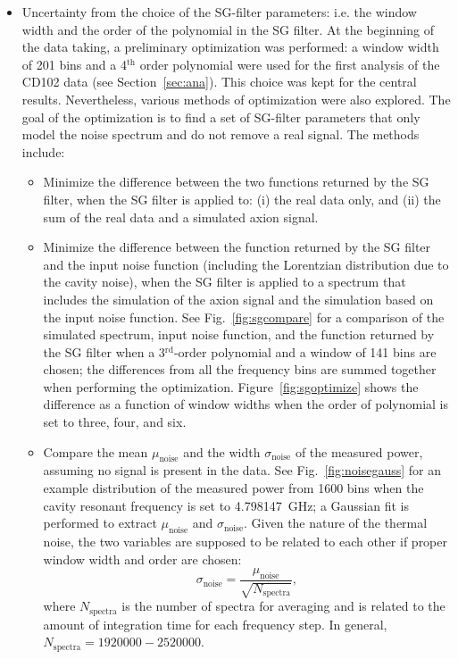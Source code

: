 \begin{itemize}
\item Uncertainty from the choice of the SG-filter parameters: i.e.  
the window width and the order of the polynomial in the SG filter. At the 
beginning of the data taking, a preliminary optimization was performed: a 
window width of 201 bins and a 4$^\text{th}$ order polynomial were used for 
the first analysis of the CD102 data (see Section~\ref{sec:ana}). 
This choice was kept for the central results. 
Nevertheless, various methods of optimization were also explored. The goal 
of the optimization is to find a set of SG-filter parameters that only 
model the noise spectrum and do not remove a real signal. 
The methods include:
\begin{itemize}
 \item Minimize the difference between the two functions returned by the SG 
filter, when the SG filter is applied to: (i) the real data only, and (ii) 
the sum of the real data and a simulated axion signal. 
 \item Minimize the difference between the function returned by the 
 SG filter and the input noise function (including the Lorentzian distribution 
due to the cavity noise), when the SG filter is applied to
a spectrum that includes the simulation of the axion signal and 
the simulation based on the input noise function. See Fig.~\ref{fig:sgcompare} 
for a comparison of  the simulated spectrum, input noise function, and the 
function returned by 
 the SG filter when a 3$^\text{rd}$-order polynomial and a window of 141 
 bins are chosen; the differences from all the frequency bins are summed 
 together when performing the optimization.
 Figure~\ref{fig:sgoptimize} shows the difference 
as a function of window widths when the order of polynomial is 
 set to three, four, and six. 
 \item Compare the mean $\mu_\text{noise}$ and the width $\sigma_\text{noise}$ 
of the measured power, assuming no signal is present in the 
data. See Fig.~\ref{fig:noisegauss} for an example distribution 
of the measured power from 1600 bins when the cavity resonant frequency 
is set to 4.798147~GHz; a Gaussian fit is performed to extract 
$\mu_\text{noise}$ and $\sigma_\text{noise}$. Given the nature of the 
thermal noise, the two variables are supposed to be related to 
each other if proper window width and order are chosen:
\begin{equation*} 
\sigma_\text{noise} = \frac{\mu_\text{noise}}{\sqrt{N_\text{spectra}}},
\end{equation*}
where $N_\text{spectra}$ is the number of spectra for averaging and 
is related to the amount of integration time for each frequency step. In 
general, $N_\text{spectra}=1920000-2520000$. 
\end{itemize}


\end{itemize}
